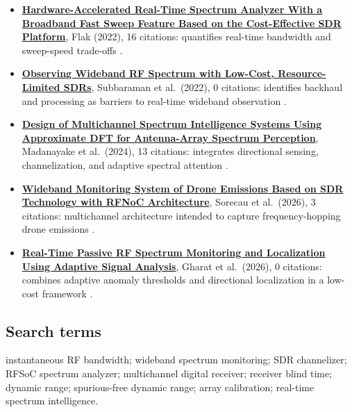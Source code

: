 \documentclass[
  10pt,
]{article}
\providecommand{\tightlist}{%
  \setlength{\itemsep}{0pt}\setlength{\parskip}{0pt}}
\begin{document}
\begin{itemize}
\tightlist
\item
  \href{https://consensus.app/papers/details/fe357d36f1dc5626b1f9d7fae0ff75a7/?utm_source=chatgpt}{\textbf{Hardware-Accelerated
  Real-Time Spectrum Analyzer With a Broadband Fast Sweep Feature Based
  on the Cost-Effective SDR Platform}}, Flak (2022), 16 citations:
  quantifies real-time bandwidth and sweep-speed trade-offs
  \citep{flak2022}.
\item
  \href{https://consensus.app/papers/details/f527168041d95e7ba00d1be0e2d79a21/?utm_source=chatgpt}{\textbf{Observing
  Wideband RF Spectrum with Low-Cost, Resource-Limited SDRs}},
  Subbaraman et al.~(2022), 0 citations: identifies backhaul and
  processing as barriers to real-time wideband observation
  \citep{subbaraman2022}.
\item
  \href{https://consensus.app/papers/details/1f33f743e5f75b38b47a1905f27c7a5f/?utm_source=chatgpt}{\textbf{Design
  of Multichannel Spectrum Intelligence Systems Using Approximate DFT
  for Antenna-Array Spectrum Perception}}, Madanayake et al.~(2024), 13
  citations: integrates directional sensing, channelization, and
  adaptive spectral attention \citep{madanayake2024}.
\item
  \href{https://consensus.app/papers/details/9d218ae20f9b5c1dae9b17a3583aece9/?utm_source=chatgpt}{\textbf{Wideband
  Monitoring System of Drone Emissions Based on SDR Technology with
  RFNoC Architecture}}, Sorecau et al.~(2026), 3 citations: multichannel
  architecture intended to capture frequency-hopping drone emissions
  \citep{sorecau2026}.
\item
  \href{https://consensus.app/papers/details/6719301371565fb4bacbf2c123a0d12d/?utm_source=chatgpt}{\textbf{Real-Time
  Passive RF Spectrum Monitoring and Localization Using Adaptive Signal
  Analysis}}, Gharat et al.~(2026), 0 citations: combines adaptive
  anomaly thresholds and directional localization in a low-cost
  framework \citep{gharat2026}.
\end{itemize}

\subsection{Search terms}\label{search-terms-4}

instantaneous RF bandwidth; wideband spectrum monitoring; SDR
channelizer; RFSoC spectrum analyzer; multichannel digital receiver;
receiver blind time; dynamic range; spurious-free dynamic range; array
calibration; real-time spectrum intelligence.
\end{document}
